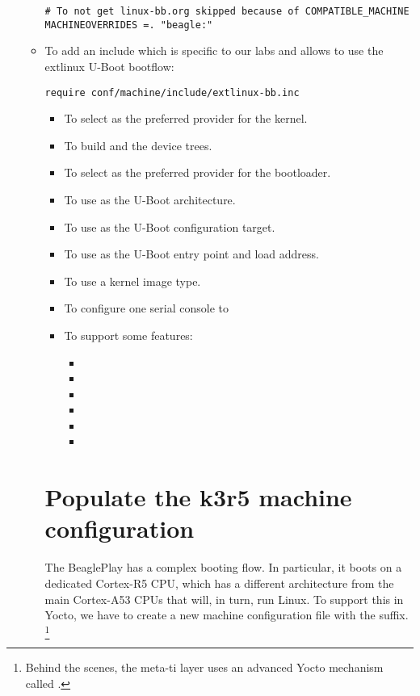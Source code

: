 \begin{itemize}
\begin{itemize}
\begin{verbatim}
# To not get linux-bb.org skipped because of COMPATIBLE_MACHINE
MACHINEOVERRIDES =. "beagle:"
\end{verbatim}
  \item To add an include which is specific to our labs
  and allows to use the extlinux U-Boot bootflow:
\begin{verbatim}
require conf/machine/include/extlinux-bb.inc
\end{verbatim}
  \else
\begin{itemize}
  \item To select  as the preferred provider
    for the kernel.
  \item To build  and the
     device trees.
  \item To select  as the preferred provider
    for the bootloader.
  \item To use  as the U-Boot architecture.
  \item To use  as the U-Boot
    configuration target.
  \item To use  as the U-Boot entry point and load
    address.
  \item To use a  kernel image type.
  \item To configure one serial console to 
  \item To support some features:
    \begin{itemize}
      \item {}
      \item {}
      \item {}
      \item {}
      \item {}
      \item {}
    \end{itemize}
  \fi
\fi
\end{itemize}

\if{}
\section{Populate the k3r5 machine configuration}

The BeaglePlay has a complex booting flow. In particular, it boots on a dedicated Cortex-R5 CPU,
 which has a different architecture from the main Cortex-A53 CPUs that will, in turn, run Linux.
 To support this in Yocto, we have to create a new machine configuration file with the  suffix.
\footnote{Behind the scenes, the meta-ti layer uses an advanced Yocto mechanism called .}


\end{itemize}
\end{itemize}
